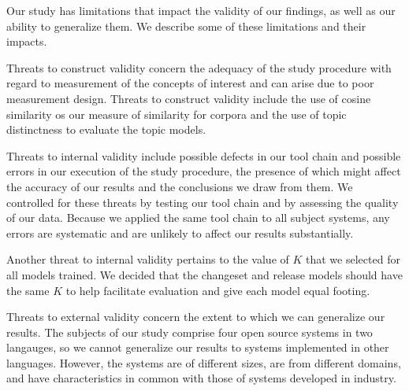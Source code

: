 
Our study has limitations that impact the validity of our findings,
as well as our ability to generalize them.
We describe some of these limitations and their impacts.

Threats to construct validity concern the adequacy of the study procedure with regard to
measurement of the concepts of interest and can arise due to poor measurement design.
Threats to construct validity include the use of cosine similarity os our measure of similarity for corpora
and the use of topic distinctness to evaluate the topic models.

Threats to internal validity include possible defects in our tool chain and possible errors
in our execution of the study procedure,
the presence of which might affect the accuracy of our results and the conclusions we draw from them.
We controlled for these threats by testing our tool chain and by assessing the quality of our data.
Because we applied the same tool chain to all subject systems, any errors are systematic and are unlikely
to affect our results substantially.

Another threat to internal validity pertains to the value of $K$ that we selected for all models trained.
We decided that the changeset and release models should have the same $K$
to help facilitate evaluation and give each model equal footing.

Threats to external validity concern the extent to which we can generalize our results.
The subjects of our study comprise four open source systems in two langauges,
so we cannot generalize our results to systems implemented in other languages.
However, the systems are of different sizes, are from different domains, and
have characteristics in common with those of systems developed in industry.

